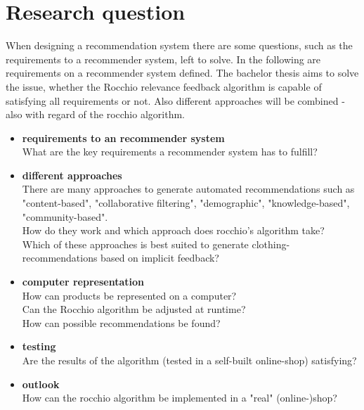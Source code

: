 

\section{Research question}
When designing a recommendation system there are some questions, such as the requirements to a recommender system, left to solve.
In the following are requirements on a recommender system defined.
The bachelor thesis aims to solve the issue, whether the Rocchio relevance feedback algorithm is capable of satisfying all requirements or not.
Also different approaches will be combined - also with regard of the rocchio algorithm.

\begin{itemize}
    \item \textbf{requirements to an recommender system}\\
        What are the key requirements a recommender system has to fulfill?

    \item \textbf{different approaches}\\
        There are many approaches to generate automated recommendations such as "content-based", "collaborative filtering", "demographic", "knowledge-based", "community-based".\citep[p.~10-12]{ricci:11}\\
        How do they work and which approach does rocchio's algorithm take?\\
        Which of these approaches is best suited to generate clothing-recommendations based on implicit feedback?

    \item \textbf{computer representation}\\
        How can products be represented on a computer?\\
        Can the Rocchio algorithm be adjusted at runtime?\\
        How can possible recommendations be found?

    \item \textbf{testing}\\
        Are the results of the algorithm (tested in a self-built online-shop) satisfying?

    \item \textbf{outlook}\\
        How can the rocchio algorithm be implemented in a "real" (online-)shop?
        
\end{itemize}










